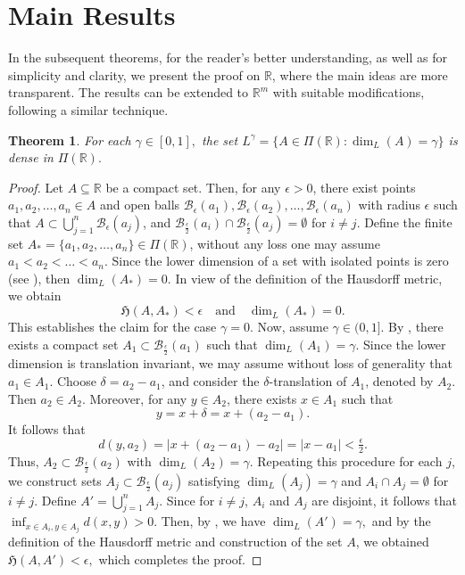 \documentclass{amsproc}
\newtheorem{theorem}{Theorem}[section]
\theoremstyle{definition}
\theoremstyle{remark}
\numberwithin{equation}{section}
\begin{document}
\section{Main Results}
In the subsequent theorems, for the reader's better understanding, as well as for simplicity and clarity, we present the proof on $\mathbb{R}$, where the main ideas are more transparent. The results can be extended to $\mathbb{R}^m$ with suitable modifications, following a similar technique.
\begin{theorem} \label{thm3.1}
    For each $\gamma\in[0,1],$ the set $L^\gamma=\{A\in \Pi(\mathbb
    R): \dim_L(A)=\gamma\}$ is dense in $\Pi(\mathbb
    R).$ 
\end{theorem}
\begin{proof}
Let $A \subseteq \mathbb{R}$ be a compact set. Then, for any $\epsilon > 0$, there exist points $a_1, a_2, \ldots, a_n \in A$ and open balls $\mathcal{B}_\epsilon(a_1), \mathcal{B}_\epsilon(a_2), \ldots, \mathcal{B}_\epsilon(a_n)$ with radius $\epsilon$ such that $A \subset \bigcup_{j=1}^n \mathcal{B}_\epsilon(a_j)$, and $\mathcal{B}_\frac{\epsilon}{2}(a_i) \cap \mathcal{B}_\frac{\epsilon}{2}(a_j) = \emptyset$ for $i \ne j$. Define the finite set $A_* = \{a_1, a_2, \ldots, a_n\} \in \Pi(\mathbb{R})$, without any loss one may assume $a_1<a_2< \dots < a_n$. Since the lower dimension of a set with isolated points is zero (see \cite{Fraser}), then $\dim_L(A_*) = 0$. In view of the definition of the Hausdorff metric, we obtain  
\[
\mathfrak{H}(A, A_*) < \epsilon \quad \text{and} \quad \dim_L (A_*) = 0.
\]  
This establishes the claim for the case $ \gamma=0$.  
Now, assume $\gamma \in (0, 1]$. By \cite[Theorem 1]{Chen}, there exists a compact set $A_1 \subset \mathcal{B}_\frac{\epsilon}{2}(a_1)$ such that $\dim_L (A_1) = \gamma$. Since the lower dimension is translation invariant, we may assume without loss of generality that $a_1 \in A_1$.  
Choose $\delta = a_2 - a_1$, and consider the $\delta$-translation of $A_1$, denoted by $A_2$. Then $a_2 \in A_2$. Moreover, for any $y \in A_2$, there exists $x \in A_1$ such that  
\[
y = x + \delta = x + (a_2 - a_1).
\]  
It follows that  
\[
d(y, a_2) = |x + (a_2 - a_1) - a_2| = |x - a_1| < \tfrac{\epsilon}{2}.
\] Thus, $A_2 \subset \mathcal{B}_\frac{\epsilon}{2}(a_2)$ with $\dim_L (A_2) = \gamma$. Repeating this procedure for each $j$, we construct sets $A_j \subset \mathcal{B}_{\frac{\epsilon}{2}}(a_j)$ satisfying $\dim_L (A_j) = \gamma$ and $A_i \cap A_j =\emptyset$ for $i \ne j$.  
Define $A' = \bigcup_{j=1}^n A_j$. Since for $i \neq j$, $A_i$ and $A_j$ are disjoint, it follows that $\inf_{x \in A_i, y \in A_j} d(x,y)>0.$ Then, by \cite[Lemma 3.4.9]{Fraser}, we have $\dim_L (A') = \gamma,$ and by the definition of the Hausdorff metric and construction of the set $A$, we obtained $\mathfrak{H}(A, A') < \epsilon,$ which completes the proof.
\end{proof}
\end{document}
